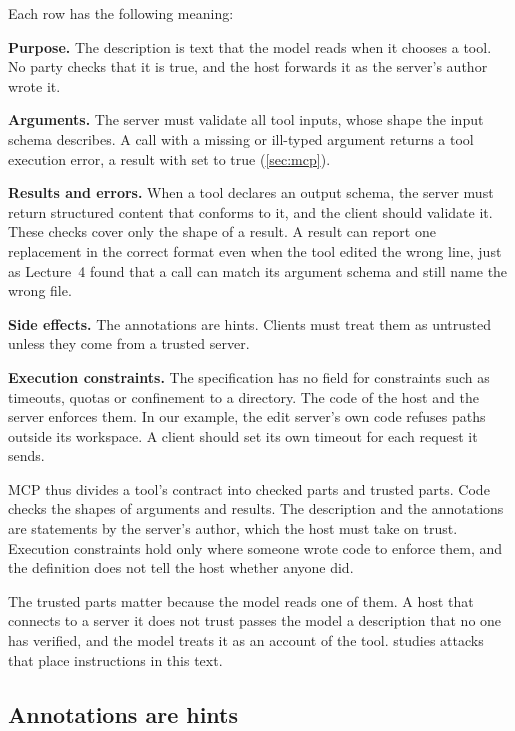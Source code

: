 Each row has the following meaning:
\bi
\item \textbf{Purpose.} The description is text that the model reads when it chooses a tool. No
party checks that it is true, and the host forwards it as the server's author wrote it.
\item \textbf{Arguments.} The server must validate all tool inputs, whose shape the input
schema describes. A call with a missing or ill-typed argument returns a tool execution error, a result with
 set to true (\cref{sec:mcp}).
\item \textbf{Results and errors.} When a tool declares an output schema, the server must return
structured content that conforms to it, and the client should validate it. These checks cover only
the shape of a result. A result can report one replacement in the correct format even
when the tool edited the wrong line, just as Lecture~4 found that a call can match its argument
schema and still name the wrong file.
\item \textbf{Side effects.} The annotations are hints. Clients must treat them as untrusted unless
they come from a trusted server.
\item \textbf{Execution constraints.} The specification has no field for constraints such as
timeouts, quotas or confinement to a directory. The code of the host and the server enforces them.
In our example, the edit server's own code refuses paths outside its workspace. A client should set
its own timeout for each request it sends.
\ei

MCP thus divides a tool's contract into checked parts and trusted parts. Code checks the shapes of
arguments and results. The description and the annotations are statements by the server's author,
which the host must take on trust. Execution constraints hold only where someone wrote code to
enforce them, and the definition does not tell the host whether anyone did.

The trusted parts matter because the model reads one of them. A host that connects to a server it
does not trust passes the model a description that no one has verified, and the model treats it as
an account of the tool.  studies attacks that place instructions in this text.

\subsection{Annotations are hints}
\label{sec:mcpcontract-annotations}

